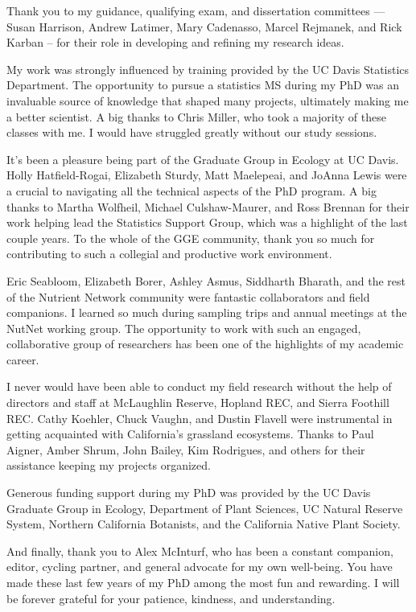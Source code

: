 \documentclass[twoside,12pt,final]{ucthesis-CA2012}
\begin{document}
\begin{ucfrontmatter}
\begin{acknowledgements}
    Thank you to my guidance, qualifying exam, and dissertation committees --- Susan Harrison, Andrew Latimer, Mary Cadenasso, Marcel Rejmanek, and Rick Karban -- for their role in developing and refining my research ideas.

    My work was strongly influenced by training provided by the UC Davis Statistics Department. The opportunity to pursue a statistics MS during my PhD was an invaluable source of knowledge that shaped many projects, ultimately making me a better scientist. A big thanks to Chris Miller, who took a majority of these classes with me. I would have struggled greatly without our study sessions.

    It's been a pleasure being part of the Graduate Group in Ecology at UC Davis. Holly Hatfield-Rogai, Elizabeth Sturdy, Matt Maelepeai, and JoAnna Lewis were a crucial to navigating all the technical aspects of the PhD program. A big thanks to Martha Wolfheil, Michael Culshaw-Maurer, and Ross Brennan for their work helping lead the Statistics Support Group, which was a highlight of the last couple years. To the whole of the GGE community, thank you so much for contributing to such a collegial and productive work environment.

    Eric Seabloom, Elizabeth Borer, Ashley Asmus, Siddharth Bharath, and the rest of the Nutrient Network community were fantastic collaborators and field companions. I learned so much during sampling trips and annual meetings at the NutNet working group. The opportunity to work with such an engaged, collaborative group of researchers has been one of the highlights of my academic career.

    I never would have been able to conduct my field research without the help of directors and staff at McLaughlin Reserve, Hopland REC, and Sierra Foothill REC. Cathy Koehler, Chuck Vaughn, and Dustin Flavell were instrumental in getting acquainted with California's grassland ecosystems. Thanks to Paul Aigner, Amber Shrum, John Bailey, Kim Rodrigues, and others for their assistance keeping my projects organized.

    Generous funding support during my PhD was provided by the UC Davis Graduate Group in Ecology, Department of Plant Sciences, UC Natural Reserve System, Northern California Botanists, and the California Native Plant Society.

    And finally, thank you to Alex McInturf, who has been a constant companion, editor, cycling partner, and general advocate for my own well-being. You have made these last few years of my PhD among the most fun and rewarding. I will be forever grateful for your patience, kindness, and understanding.


\end{acknowledgements}
\end{ucfrontmatter}
\end{document}
